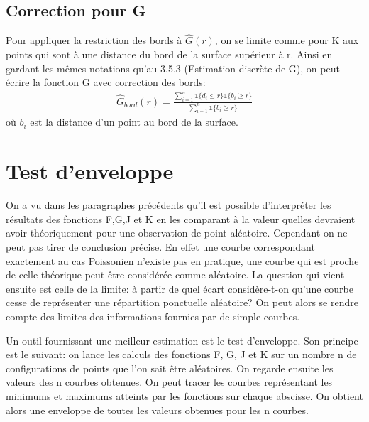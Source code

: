\documentclass[stage2a]{tnreport}
\begin{document}

\subsection{Correction pour G}

Pour appliquer la restriction des bords à \begin{math} \hat{G}(r) \end{math}, on se limite comme pour K aux points qui sont à une distance du bord de la surface supérieur à r. Ainsi en gardant les mêmes notations qu'au 3.5.3 (Estimation discrète de G), on peut écrire la fonction G avec correction des bords:
\begin{align*}
\hat{G}_{bord}(r) = \frac{  \sum_{i=1}^n \mathds{1} \{d_i \leq r \} \mathds{1} \{b_i \geq r \} }{ \sum_{i=1}^n \mathds{1} \{b_i \geq r \}}
\end{align*}
où \begin{math}b_i\end{math} est la distance d'un point au bord de la surface.


\section{Test d'enveloppe}

On a vu dans les paragraphes précédents qu'il est possible d'interpréter les résultats des fonctions F,G,J et K en les comparant à la valeur quelles devraient avoir théoriquement pour une observation de point aléatoire. Cependant on ne peut pas tirer de conclusion précise. En effet une courbe correspondant exactement au cas Poissonien n'existe pas en pratique, une courbe qui est proche de celle théorique peut être considérée comme aléatoire. La question qui vient ensuite est celle de la limite: à partir de quel écart considère-t-on qu'une courbe cesse de représenter une répartition ponctuelle aléatoire? On peut alors se rendre compte des limites des informations fournies par de simple courbes. 

Un outil fournissant une meilleur estimation est le test d'enveloppe. Son principe est le suivant:
on lance les calculs des fonctions F, G, J et K sur un nombre n de configurations de points que l'on sait être aléatoires. On regarde ensuite les valeurs des n courbes obtenues. On peut tracer les courbes représentant les minimums et maximums atteints par les fonctions sur chaque abscisse. On obtient alors une enveloppe de toutes les valeurs obtenues pour les n courbes. 
\end{document}
